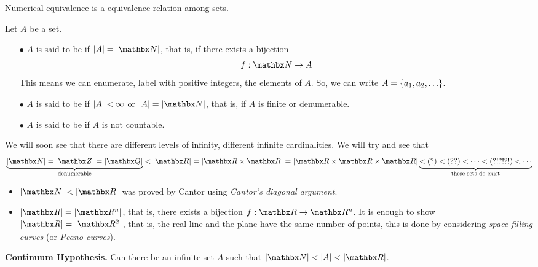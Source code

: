 \vspace*{1em}

\begin{theorem}\label{thm:num-eq}
Numerical equivalence is a equivalence relation among sets. 
\end{theorem}

\vspace*{1em}

\begin{definition}
Let $A$ be a set.
\begin{itemize}
\item[$\bullet$] $A$ is said to be  if $\abs{A} = \abs{\nn}$, that is, if there exists a bijection
\[f:\nn \to A\]
This means we can enumerate, label with positive integers, the elements of $A$. So, we can write $A = \left\{a_1,a_2,\ldots\right\}$.
\item[$\bullet$] $A$ is said to be  if $\left\lvert A\right\rvert < \infty$ or $\abs{A} = \abs{\nn}$, that is, if $A$ is finite or denumerable. 
\item[$\bullet$] $A$ is said to be  if $A$ is not countable.
\end{itemize}
\end{definition}

\vspace*{1em}

\begin{discussion}
We will soon see that there are different levels of infinity, different infinite cardinalities. We will try and see that
\[\underbrace{\abs{\nn} = \abs{\zz} = \abs{\qq}}_{\text{denumerable}} < \abs{\rr} = \abs{\rr \times \rr} = \abs{\rr \times \rr \times \rr} \underbrace{< (?) < (??) < \cdots  < (?!?!?!) < \cdots}_{\text{these sets do exist}}\]
\begin{itemize}
\item $\abs{\nn} < \abs{\rr}$ was proved by Cantor using \emph{Cantor's diagonal argument}.
\item $\abs{\rr} = \abs{\rr^n}$, that is, there exists a bijection $f:\rr \to \rr^n$. It is enough to show $\abs{\rr} = \abs{\rr^2}$, that is, the real line and the plane have the same number of points, this is done by considering \emph{space-filling curves} (or \emph{Peano curves}).
\end{itemize}
\vspace*{0.5em}
{\bf Continuum Hypothesis.} Can there be an infinite set $A$ such that $\abs{\nn} < \abs{A} < \abs{\rr}$.
\end{discussion}

